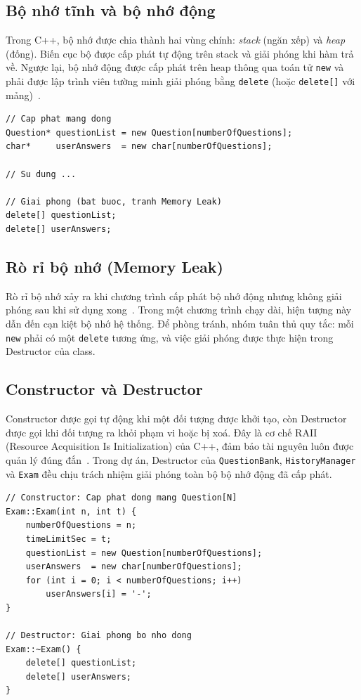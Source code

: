 \documentclass[11pt]{report}
\begin{document}
\subsection{Bộ nhớ tĩnh và bộ nhớ động}

Trong C++, bộ nhớ được chia thành hai vùng chính: \textit{stack} (ngăn xếp) và \textit{heap} (đống). Biến cục bộ được cấp phát tự động trên stack và giải phóng khi hàm trả về. Ngược lại, bộ nhớ động được cấp phát trên heap thông qua toán tử \texttt{new} và phải được lập trình viên tường minh giải phóng bằng \texttt{delete} (hoặc \texttt{delete[]} với mảng)~\cite{stroustrup2013}.

\begin{lstlisting}[caption={Cấp phát và giải phóng mảng động trong C++}, label={lst:dynamic}]
// Cap phat mang dong
Question* questionList = new Question[numberOfQuestions];
char*     userAnswers  = new char[numberOfQuestions];

// Su dung ...

// Giai phong (bat buoc, tranh Memory Leak)
delete[] questionList;
delete[] userAnswers;
\end{lstlisting}

\subsection{Rò rỉ bộ nhớ (Memory Leak)}

Rò rỉ bộ nhớ xảy ra khi chương trình cấp phát bộ nhớ động nhưng không giải phóng sau khi sử dụng xong~\cite{stroustrup2013}. Trong một chương trình chạy dài, hiện tượng này dẫn đến cạn kiệt bộ nhớ hệ thống. Để phòng tránh, nhóm tuân thủ quy tắc: mỗi \texttt{new} phải có một \texttt{delete} tương ứng, và việc giải phóng được thực hiện trong Destructor của class.

\subsection{Constructor và Destructor}

Constructor được gọi tự động khi một đối tượng được khởi tạo, còn Destructor được gọi khi đối tượng ra khỏi phạm vi hoặc bị xoá. Đây là cơ chế RAII (Resource Acquisition Is Initialization) của C++, đảm bảo tài nguyên luôn được quản lý đúng đắn~\cite{stroustrup2013}. Trong dự án, Destructor của \texttt{QuestionBank}, \texttt{HistoryManager} và \texttt{Exam} đều chịu trách nhiệm giải phóng toàn bộ bộ nhớ động đã cấp phát.

\begin{lstlisting}[caption={Constructor và Destructor của lớp Exam}, label={lst:examctor}]
// Constructor: Cap phat dong mang Question[N]
Exam::Exam(int n, int t) {
    numberOfQuestions = n;
    timeLimitSec = t;
    questionList = new Question[numberOfQuestions];
    userAnswers  = new char[numberOfQuestions];
    for (int i = 0; i < numberOfQuestions; i++)
        userAnswers[i] = '-';
}

// Destructor: Giai phong bo nho dong
Exam::~Exam() {
    delete[] questionList;
    delete[] userAnswers;
}
\end{lstlisting}
\end{document}
